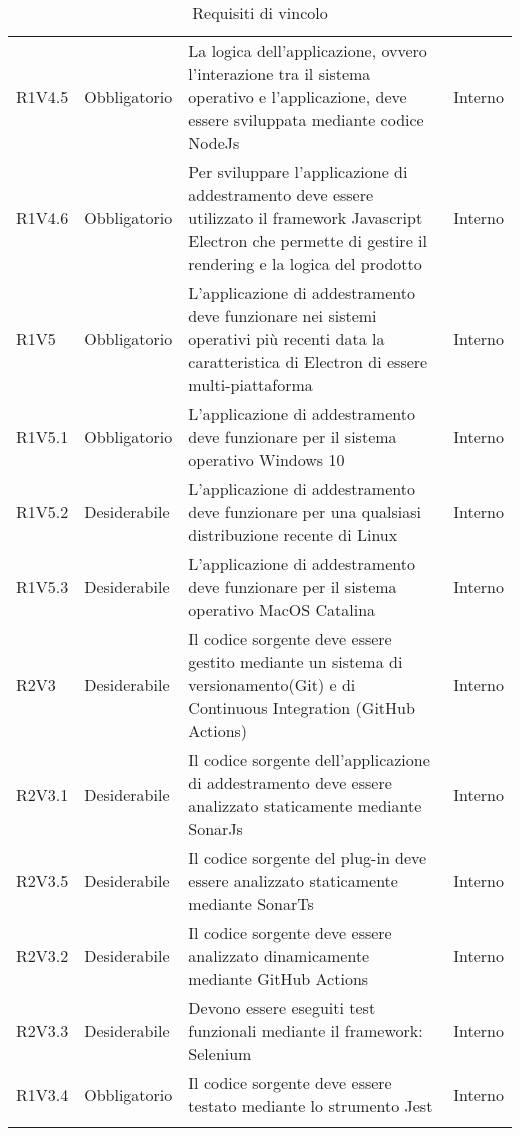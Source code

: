 \begin{longtable} {
		>{\centering}p{18mm} 
		>{\centering}p{28mm}
		>{}p{50mm} 
		>{}p{28mm}
		}
	R1V4.5 & 
	Obbligatorio & 
	La logica dell'applicazione, ovvero l'interazione tra il sistema operativo e l'applicazione, deve essere sviluppata mediante codice NodeJs &
	Interno  \TBstrut \\ [2mm]

	R1V4.6 & 
	Obbligatorio & 
	Per sviluppare l'applicazione di addestramento deve essere utilizzato il framework Javascript Electron che permette di gestire il rendering e la logica del prodotto &
	Interno  \TBstrut \\ [2mm]
	
	R1V5 & 
	Obbligatorio & 
	L'applicazione di addestramento deve funzionare nei sistemi operativi più recenti data la caratteristica di Electron di essere multi-piattaforma & 
	Interno  \TBstrut \\ [2mm]

	R1V5.1 & 
	Obbligatorio & 
	L'applicazione di addestramento deve funzionare per il sistema operativo Windows 10 &
	Interno  \TBstrut \\ [2mm]

	R1V5.2 & 
	Desiderabile & 
	L'applicazione di addestramento deve funzionare per una qualsiasi distribuzione recente di Linux &
	Interno  \TBstrut \\ [2mm]

	R1V5.3 & 
	Desiderabile & 
	L'applicazione di addestramento deve funzionare per il sistema operativo MacOS Catalina &
	Interno  \TBstrut \\ [2mm]
		
	R2V3 &
	Desiderabile &
	Il codice sorgente deve essere gestito mediante un sistema di versionamento\glosp (Git) e di Continuous Integration (GitHub Actions) &
	Interno  \TBstrut \\ [2mm]		
	
	R2V3.1 &
	Desiderabile &
	Il codice sorgente dell'applicazione di addestramento deve essere analizzato staticamente mediante SonarJs\glo &
	Interno  \TBstrut \\ [2mm]
	
	R2V3.5 &
	Desiderabile &
	Il codice sorgente del plug-in deve essere analizzato staticamente mediante SonarTs\glo &
	Interno  \TBstrut \\ [2mm]
	
	R2V3.2 &
	Desiderabile &
	Il codice sorgente deve essere analizzato dinamicamente mediante GitHub Actions &
	Interno  \TBstrut \\ [2mm]
	
	R2V3.3 &
	Desiderabile &
	Devono essere eseguiti test funzionali mediante il framework: Selenium &
	Interno  \TBstrut \\ [2mm]
	
	R1V3.4 &
	Obbligatorio &
	Il codice sorgente deve essere testato mediante lo strumento Jest &
	Interno  \TBstrut \\ [2mm]
	
	\rowcolor{white}
	\caption{Requisiti di vincolo}
\end{longtable}
